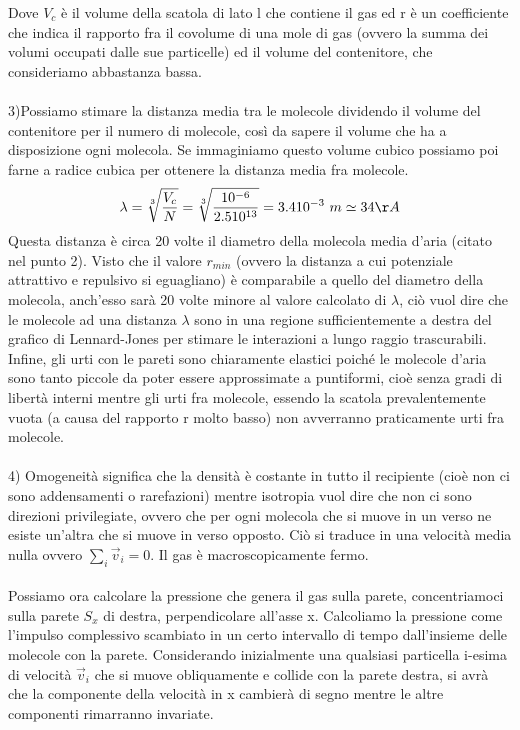 \documentclass[
10pt, %
a4paper, %
oneside, %
headinclude,footinclude, %
BCOR5mm, %
]{scrartcl}
\begin{document}
Dove $V_c$ è il volume della scatola di lato l che contiene il gas ed r è un coefficiente che indica il rapporto fra il covolume di una mole di gas (ovvero la summa dei volumi occupati dalle sue particelle) ed il volume del contenitore, che consideriamo abbastanza bassa. \\\\
3)Possiamo stimare la distanza media tra le molecole dividendo il volume del contenitore per il numero di molecole, così da sapere il volume che ha a disposizione ogni molecola. Se immaginiamo questo volume cubico possiamo poi farne a radice cubica per ottenere la distanza media fra molecole.
\begin{align*} 
	\lambda = \sqrt[3]{\frac{V_c}{N}} = \sqrt[3]{\frac{10^{-6}}{2.5 10^{13}}}= 3.4 10^{-3}\ m \simeq 34\AA
\end{align*} 
Questa distanza è circa 20 volte il diametro della molecola media d'aria (citato nel punto 2). Visto che il valore $r_{min}$ (ovvero la distanza a cui potenziale attrattivo e repulsivo si eguagliano) è comparabile a quello del diametro della molecola, anch'esso sarà 20 volte minore al valore calcolato di $\lambda$, ciò vuol dire che le molecole ad una distanza $\lambda$ sono in una regione sufficientemente a destra del grafico di Lennard-Jones per stimare le interazioni a lungo raggio trascurabili. Infine, gli urti con le pareti sono chiaramente elastici poiché le molecole d'aria sono tanto piccole da poter essere approssimate a puntiformi, cioè senza gradi di libertà interni mentre gli urti fra molecole, essendo la scatola prevalentemente vuota (a causa del rapporto r molto basso) non avverranno praticamente urti fra molecole.\\\\
4) Omogeneità significa che la densità è costante in tutto il recipiente (cioè non ci sono addensamenti o rarefazioni) mentre isotropia vuol dire che non ci sono direzioni privilegiate, ovvero che per ogni molecola che si muove in un verso ne esiste un'altra che si muove in verso opposto. Ciò si traduce in una velocità media nulla ovvero $\sum_i \vec{v}_i = 0$. Il gas è macroscopicamente fermo.\\\\
Possiamo ora calcolare la pressione che genera il gas sulla parete, concentriamoci sulla parete $S_x$ di destra, perpendicolare all'asse x. Calcoliamo la pressione come l'impulso complessivo scambiato in un certo intervallo di tempo dall'insieme delle molecole con la parete. Considerando inizialmente una qualsiasi particella i-esima di velocità $\vec{v}_i$ che si muove obliquamente e collide con la parete destra, si avrà che la componente della velocità in x cambierà di segno mentre le altre componenti rimarranno invariate.
\end{document}
